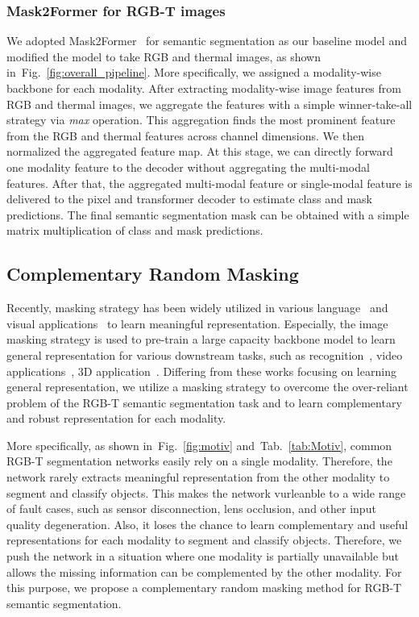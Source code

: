 \documentclass[10pt,twocolumn,letterpaper]{article}
\newcommand{\figref}[1]{Fig.~\ref{#1}}
\newcommand{\tabref}[1]{Tab.~\ref{#1}}
\begin{document}
\subsubsection{Mask2Former for RGB-T images}
We adopted Mask2Former~\cite{cheng2022masked} for semantic segmentation as our baseline model and modified the model to take RGB and thermal images, as shown in~\figref{fig:overall_pipeline}.
More specifically, we assigned a modality-wise backbone for each modality. 
After extracting modality-wise image features from RGB and thermal images, we aggregate the features with a simple winner-take-all strategy via \textit{max} operation.
This aggregation finds the most prominent feature from the RGB and thermal features across channel dimensions.
We then normalized the aggregated feature map.
At this stage, we can directly forward one modality feature to the decoder without aggregating the multi-modal features.
After that, the aggregated multi-modal feature or single-modal feature is delivered to the pixel and transformer decoder to estimate  class and mask predictions.
The final semantic segmentation mask can be obtained with a simple matrix multiplication of class and mask predictions.

\subsection{Complementary Random Masking}
Recently, masking strategy has been widely utilized in various language~\cite{devlin2018bert, liu2019roberta, brown2020language} and visual applications~\cite{bao2021beit,he2022masked,wei2022masked,tong2022videomae,xie2022simmim,pang2022masked} to learn meaningful representation.
Especially, the image masking strategy is used to pre-train a large capacity backbone model to learn general representation for various downstream tasks, such as recognition~\cite{he2022masked,wei2022masked}, video applications~\cite{tong2022videomae}, 3D application~\cite{pang2022masked}.
Differing from these works focusing on learning general representation, we utilize a masking strategy to overcome the over-reliant problem of the RGB-T semantic segmentation task and to learn complementary and robust representation for each modality.

More specifically, as shown in~\figref{fig:motiv} and~\tabref{tab:Motiv}, common RGB-T segmentation networks easily rely on a single modality. 
Therefore, the network rarely extracts meaningful representation from the other modality to segment and classify objects.
This makes the network vurleanble to a wide range of fault cases, such as sensor disconnection, lens occlusion, and other input quality degeneration. 
Also, it loses the chance to learn complementary and useful representations for each modality to segment and classify objects. 
Therefore, we push the network in a situation where one modality is partially unavailable but allows the missing information can be complemented by the other modality. 
For this purpose, we propose a complementary random masking method for RGB-T semantic segmentation.
\end{document}
